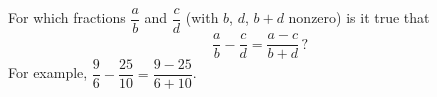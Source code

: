 For which fractions \(\dfrac {a}{b}\) and \(\dfrac {c}{d}\) (with \(b\), \(d\), \(b+d\) nonzero) is it true that
\[
\dfrac {a}{b}-\dfrac {c}{d}=\dfrac{a-c}{b+d}\,?
\]
For example, \(\dfrac{9}{6}-\dfrac{25}{10}=\dfrac{9-25}{6+10}\).
